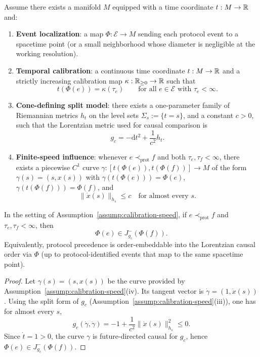 \begin{assumption}\label{assump:calibration-speed}
Assume there exists a manifold $M$ equipped with a time coordinate $t:M\to\mathbb{R}$ and:
\begin{enumerate}[label=(\roman*),leftmargin=*,itemsep=2pt]
  \item \textbf{Event localization}: a map $\Phi:\mathcal{E}\to M$ sending each protocol event to a spacetime point (or a small neighborhood whose diameter is negligible at the working resolution).
  \item \textbf{Temporal calibration}: a continuous time coordinate $t:M\to\mathbb{R}$ and a strictly increasing calibration map $\kappa:\mathbb{R}_{\ge 0}\to\mathbb{R}$ such that
  \[
  t(\Phi(e))=\kappa(\tau_e)\qquad\text{for all }e\in\mathcal{E}\text{ with }\tau_e<\infty.
  \]
  \item \textbf{Cone-defining split model}: there exists a one-parameter family of Riemannian metrics $h_t$ on the level sets $\Sigma_s:=\{t=s\}$, and a constant $c>0$, such that the Lorentzian metric used for causal comparison is
  \[
  g_c=-\mathrm{d}t^2+\frac{1}{c^2}h_t.
  \]
  \item \textbf{Finite-speed influence}: whenever $e\prec_{\mathrm{prot}} f$ and both $\tau_e,\tau_f<\infty$, there exists a piecewise $C^1$ curve $\gamma:[t(\Phi(e)),t(\Phi(f))]\to M$ of the form $\gamma(s)=(s,x(s))$ with $\gamma(t(\Phi(e)))=\Phi(e)$, $\gamma(t(\Phi(f)))=\Phi(f)$, and
  \[
  \lVert \dot x(s)\rVert_{h_s}\le c\quad\text{for almost every }s.
  \]
\end{enumerate}
\end{assumption}

\begin{proposition}\label{prop:priority-implies-causal}
In the setting of Assumption~\ref{assump:calibration-speed}, if $e\prec_{\mathrm{prot}} f$ and $\tau_e,\tau_f<\infty$, then
\[
\Phi(e)\in J^-_{g_c}(\Phi(f)).
\]
Equivalently, protocol precedence is order-embeddable into the Lorentzian causal order via $\Phi$ (up to protocol-identified events that map to the same spacetime point).
\end{proposition}

\begin{proof}
Let $\gamma(s)=(s,x(s))$ be the curve provided by Assumption~\ref{assump:calibration-speed}(iv). Its tangent vector is $\dot\gamma=(1,\dot x(s))$. Using the split form of $g_c$ (Assumption~\ref{assump:calibration-speed}(iii)), one has for almost every $s$,
\[
g_c(\dot\gamma,\dot\gamma) = -1 + \frac{1}{c^2}\lVert \dot x(s)\rVert_{h_s}^2 \le 0.
\]
Since $\dot t=1>0$, the curve $\gamma$ is future-directed causal for $g_c$, hence $\Phi(e)\in J^-_{g_c}(\Phi(f))$.
\end{proof}

